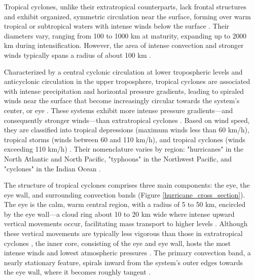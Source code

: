 Tropical cyclones, unlike their extratropical counterparts, lack frontal structures and exhibit organized, symmetric circulation near the surface, forming over warm tropical or subtropical waters with intense winds below the surface \citep{frank1977structurea, gray1968global}. Their diameters vary, ranging from 100 to 1000 km at maturity, expanding up to 2000 km during intensification. However, the area of intense convection and stronger winds typically spans a radius of about 100 km \citep{holton1973introduction}.

Characterized by a central cyclonic circulation at lower tropospheric levels and anticyclonic circulation in the upper troposphere, tropical cyclones are associated with intense precipitation and horizontal pressure gradients, leading to spiraled winds near the surface that become increasingly circular towards the system's center, or eye \citep{frank1977structurea,frank1977structureb,terry2007tropical, weatherford1988atyphoon}. These systems exhibit more intense pressure gradients—and consequently stronger winds—than extratropical cyclones \citep{spiridonov2021fundamentals}. Based on wind speed, they are classified into tropical depressions (maximum winds less than 60 km/h), tropical storms (winds between 60 and 110 km/h), and tropical cyclones (winds exceeding 110 km/h) \citep{spiridonov2021fundamentals}. Their nomenclature varies by region: "hurricanes" in the North Atlantic and North Pacific, "typhoons" in the Northwest Pacific, and "cyclones" in the Indian Ocean \citep{donald2015meteorology}.

The structure of tropical cyclones comprises three main components: the eye, the eye wall, and surrounding convection bands (Figure \ref{hurricane_cross_section}). The eye is the calm, warm central region, with a radius of 5 to 50 km, encircled by the eye wall—a cloud ring about 10 to 20 km wide where intense upward vertical movements occur, facilitating mass transport to higher levels \citep{shea1973hurricane,jorgensen1985vertical}. Although these vertical movements are typically less vigorous than those in extratropical cyclones \citep{jorgensen1985vertical}, the inner core, consisting of the eye and eye wall, hosts the most intense winds and lowest atmospheric pressures \citep{weatherford1988atyphoon}. The primary convection band, a nearly stationary feature, spirals inward from the system's outer edges towards the eye wall, where it becomes roughly tangent \citep{willoughby1984stationary}.

